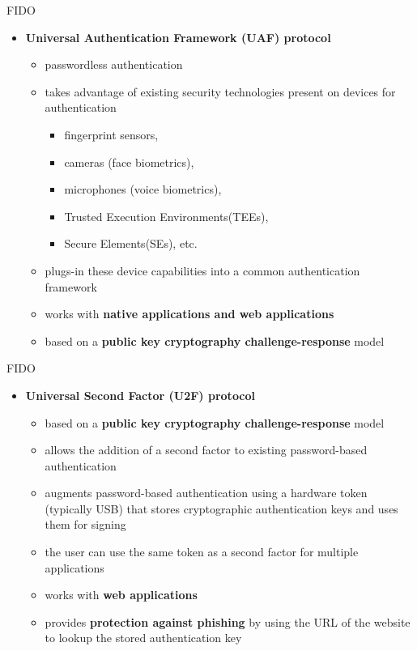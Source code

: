 \documentclass[pdf]{beamer}
\begin{document}
\begin{frame}{FIDO}
\begin{itemize}
\item
\textbf{Universal Authentication Framework (UAF) protocol}

\begin{itemize}
\item
passwordless authentication
\item
takes advantage of existing security technologies present on devices for authentication
\begin{itemize}
\item
fingerprint sensors, 
\item
cameras (face biometrics), 
\item
microphones (voice biometrics), 
\item
Trusted Execution Environments(TEEs), 
\item
Secure Elements(SEs), etc.
\end{itemize}
\item
plugs-in these device capabilities into a common authentication framework
\item
works with \textbf{native applications and web applications}
\item
based on a \textbf{public key cryptography challenge-response} model
\end{itemize}
\end{itemize}
\end{frame}



\begin{frame}{FIDO}
\begin{itemize}
\item
\textbf{Universal Second Factor (U2F) protocol}

\begin{itemize}
\item
based on a \textbf{public key cryptography challenge-response} model

\item
allows the addition of a second factor to existing password-based authentication

\item
augments password-based authentication using a hardware token (typically USB) that stores cryptographic authentication keys and uses them for signing

\item
the user can use the same token as a second factor for multiple applications

\item
works with \textbf{web applications}

\item
provides \textbf{protection against phishing} by using the URL of the website to lookup the stored authentication key
\end{itemize}
\end{itemize}
\end{frame}
\end{document}

